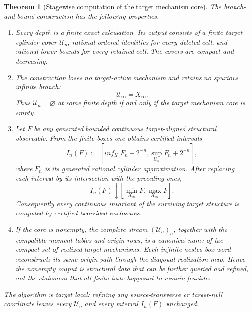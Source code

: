 \documentclass[11pt]{article}
\numberwithin{section}{part}
\theoremstyle{plain}
\newtheorem{theorem}{Theorem}[section]
\theoremstyle{definition}
\theoremstyle{remark}
\begin{document}
\begin{theorem}[Stagewise computation of the target mechanism core]
\label{thm:stagewise-target-core-computation}
The branch-and-bound construction has the following properties.
\begin{enumerate}[label=\textup{(C\arabic*)}]
\item Every depth is a finite exact calculation.  Its output consists of a
finite target-cylinder cover \(\mathscr U_n\), rational ordered identities
for every deleted cell, and rational lower bounds for every retained cell.
The covers are compact and decreasing.
\item The construction loses no target-active mechanism and retains no
spurious infinite branch:
\begin{equation}
 \label{eq:branch-bound-equals-circulation-core}
 \mathscr U_\infty=X_\infty.
\end{equation}
Thus \(\mathscr U_n=\varnothing\) at some finite depth if and only if the
target mechanism core is empty.
\item Let \(F\) be any generated bounded continuous target-aligned structural
observable.  From the finite boxes one obtains certified intervals
\[
 I_n(F):=
 \left[inf_{\mathscr U_n}F_n-2^{-n},
       \sup_{\mathscr U_n}F_n+2^{-n}\right],
 \]
where \(F_n\) is its generated rational cylinder approximation.  After
replacing each interval by its intersection with the preceding ones,
\begin{equation}
 \label{eq:target-observable-range-computation}
 I_n(F)\downarrow
 \left[\min_{X_\infty}F,\max_{X_\infty}F\right].
\end{equation}
Consequently every continuous invariant of the surviving target structure
is computed by certified two-sided enclosures.
\item If the core is nonempty, the complete stream
\((\mathscr U_n)_n\), together with the compatible moment tables and origin
rows, is a canonical name of the compact set of realized target mechanisms.
Each infinite nested box word reconstructs its same-origin path through the
diagonal realization map.  Hence the nonempty output is structural data that
can be further queried and refined, not the statement that all finite tests
happened to remain feasible.
\end{enumerate}
The algorithm is target local: refining any source-transverse or
target-null coordinate leaves every \(\mathscr U_n\) and every interval
\(I_n(F)\) unchanged.
\end{theorem}
\end{document}
